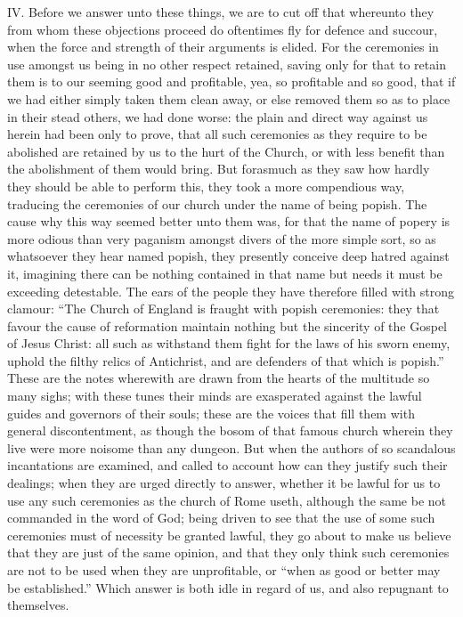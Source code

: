 IV. Before we answer unto these things, we are to cut off that whereunto they from whom these objections proceed do oftentimes fly for defence and succour, when the force and  strength of their arguments is elided. For the ceremonies in use amongst us being in no other respect retained, saving only for that to retain them is to our seeming good and profitable, yea, so profitable and so good, that if we had either simply taken them clean away, or else removed them so as to place in their stead others, we had done worse: the plain and direct way against us herein had been only to prove, that all such ceremonies as they require to be abolished are retained by us to the hurt of the Church, or with less benefit than the abolishment of them would bring. But forasmuch as they saw how hardly they should be able to perform this, they took a more compendious way, traducing the ceremonies of our church under the name of being popish. The cause why this way seemed better unto them was, for that the name of popery is more odious than very paganism amongst divers of the more simple sort, so as whatsoever they hear named popish, they presently conceive deep hatred against it, imagining there can be nothing contained in that name but needs it must be exceeding detestable. The ears of the people they have therefore filled with strong clamour: “The Church of England is fraught with popish ceremonies: they that favour the cause of reformation maintain nothing but the sincerity of the Gospel of Jesus Christ: all such as withstand them fight for the laws of his sworn enemy, uphold the filthy relics of Antichrist, and are defenders of that which is popish.” These are the notes wherewith are drawn from the hearts of the multitude so many sighs; with these tunes their minds are exasperated against the lawful guides and governors of their souls; these are the voices that fill them with general discontentment, as though the bosom of that famous church wherein they live were more noisome than any dungeon. But when the authors of so scandalous incantations are examined, and called to account how can they justify such their dealings; when they are urged directly to answer, whether it be lawful for us to use any such ceremonies as the church of Rome useth, although the same be not commanded in the word of God; being driven to see that the use of some such ceremonies must of necessity be granted lawful, they go about to make us believe that they are just of the same opinion, and that they only think such ceremonies are not to be used when they are  unprofitable, or “when as good or better may be established.” Which answer is both idle in regard of us, and also repugnant to themselves.

